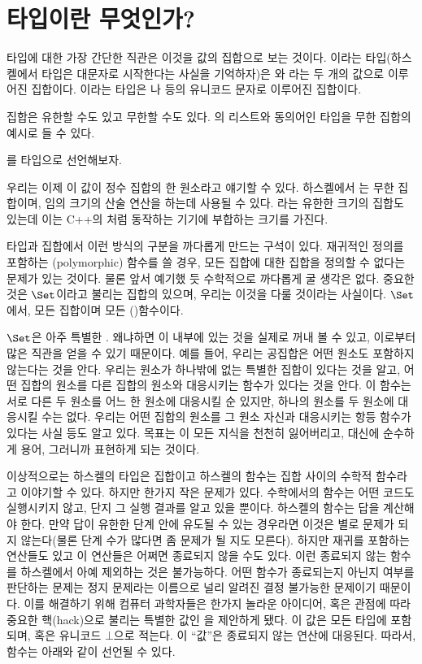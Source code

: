 \section{타입이란 무엇인가?}

타입에 대한 가장 간단한 직관은 이것을 값의 집합으로 보는 것이다.
이라는 타입(하스켈에서 타입은 대문자로 시작한다는 사실을 기억하자)은 와 라는 두 개의 값으로 이루어진 집합이다.
이라는 타입은 나  등의 유니코드 문자로 이루어진 집합이다.

집합은 유한할 수도 있고 무한할 수도 있다. 의 리스트와 동의어인  타입을 무한 집합의 예시로 들 수 있다.

를  타입으로 선언해보자.

우리는 이제 이 값이 정수 집합의 한 원소라고 얘기할 수 있다.
하스켈에서 는 무한 집합이며, 임의 크기의 산술 연산을 하는데 사용될 수 있다. 라는 유한한 크기의 집합도 있는데 이는 C++의 처럼 동작하는 기기에 부합하는 크기를 가진다.

타입과 집합에서 이런 방식의 구분을 까다롭게 만드는 구석이 있다.
재귀적인 정의를 포함하는 \trPolymorphic(polymorphic) 함수를 쓸 경우, 모든 집합에 대한 집합을 정의할 수 없다는 문제가 있는 것이다.
물론 앞서 예기했 듯 수학적으로 까다롭게 굴 생각은 없다. 중요한 것은 $\Set$이라고 불리는 집합의  있으며, 우리는 이것을 다룰 것이라는 사실이다.
$\Set$에서, 모든 \trObject\는 집합이며 모든 \trMorphism(\trArrow)\은 함수이다.

$\Set$은 아주 특별한 . 왜냐하면 이  \trObject 내부에 있는 것을 실제로 꺼내 볼 수 있고, 이로부터 많은 직관을 얻을 수 있기 때문이다.
예를 들어, 우리는 공집합은 어떤 원소도 포함하지 않는다는 것을 안다. 우리는 원소가 하나밖에 없는 특별한 집합이 있다는 것을 알고, 어떤 집합의 원소를 다른 집합의 원소와 대응시키는 함수가 있다는 것을 안다.
이 함수는 서로 다른 두 원소를 어느 한 원소에 대응시킬 순 있지만, 하나의 원소를 두 원소에 대응시킬 수는 없다.
우리는 어떤 집합의 원소를 그 원소 자신과 대응시키는 항등 함수가 있다는 사실 등도 알고 있다.
목표는 이 모든 지식을 천천히 잃어버리고, 대신에 순수하게  용어, 그러니까   표현하게 되는 것이다.

이상적으로는 하스켈의 타입은 집합이고 하스켈의 함수는 집합 사이의 수학적 함수라고 이야기할 수 있다.
하지만 한가지 작은 문제가 있다. 수학에서의 함수는 어떤 코드도 실행시키지 않고, 단지 그 실행 결과를 알고 있을 뿐이다.
하스켈의 함수는 답을 계산해야 한다. 만약 답이 유한한 단계 안에 유도될 수 있는 경우라면 이것은 별로 문제가 되지 않는다(물론 단계 수가 많다면 좀 문제가 될 지도 모른다).
하지만 재귀를 포함하는 연산들도 있고 이 연산들은 어쩌면 종료되지 않을 수도 있다. 이런 종료되지 않는 함수를 하스켈에서 아예 제외하는 것은 불가능하다.
어떤 함수가 종료되는지 아닌지 여부를 판단하는 문제는 정지 문제라는 이름으로 널리 알려진 결정 불가능한 문제이기 때문이다.
이를 해결하기 위해 컴퓨터 과학자들은 한가지 놀라운 아이디어, 혹은 관점에 따라 중요한 핵(hack)으로 불리는 특별한 값인 \newterm{\trBottom}을 제안하게 됐다.
이 값은 모든 타입에 포함되며, \code{\_|\_} 혹은 유니코드 $\bot$으로 적는다. 이 ``값''은 종료되지 않는 연산에 대응된다. 따라서, 함수는 아래와 같이 선언될 수 있다.

